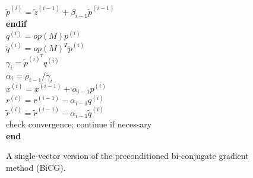 \begin{figure}
\begin{center}
{\begin{minipage}{\textwidth}
{\begin{tabbing}
\>	\>	\>	$\tilde{p}^{(i)} = \tilde{z}^{(i-1)} + \beta_{i-1} \tilde{p}^{(i-1)}$ \\
\>	\>	\textbf{endif} \\
\>	\>	$q^{(i)} = op(M) p^{(i)}$ \\
\>	\>	$\tilde{q}^{(i)} = op(M)^T \tilde{p}^{(i)}$ \\
\>	\>	$\gamma_{i} = \tilde{p}^{{(i)}^T} q^{(i)}$ \\
\>	\>	$\alpha_{i} = \rho_{i-1}/\gamma_{i}$ \\
\>	\>	$x^{(i)} = x^{(i-1)} + \alpha_{i-1} p^{(i)}$ \\
\>	\>	$r^{(i)} = r^{(i-1)} - \alpha_{i-1} q^{(i)}$ \\
\>	\>	$\tilde{r}^{(i)} = \tilde{r}^{(i-1)} - \alpha_{i-1} \tilde{q}^{(i)}$ \\
\>	\>	check convergence; continue if necessary \\
\>	\textbf{end}
\end{tabbing}
\esinglespace}
\end{minipage}
}%
\end{center}
\caption{
\label{tsfcore:fig:BiCG}
A single-vector version of the preconditioned bi-conjugate gradient method (BiCG).
}
\end{figure}

